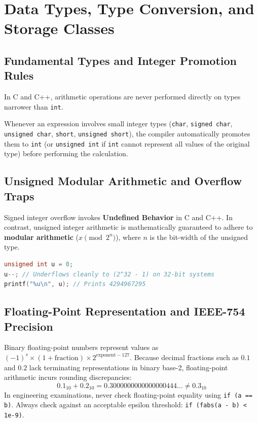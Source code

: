 \section{Data Types, Type Conversion, and Storage Classes}
\label{sec:data_types_storage_classes}

\subsection{Fundamental Types and Integer Promotion Rules}
In C and C++, arithmetic operations are never performed directly on types narrower than \texttt{int}.
\begin{keyconcept}
Whenever an expression involves small integer types (\texttt{char}, \texttt{signed char}, \texttt{unsigned char}, \texttt{short}, \texttt{unsigned short}), the compiler automatically promotes them to \texttt{int} (or \texttt{unsigned int} if \texttt{int} cannot represent all values of the original type) before performing the calculation.
\end{keyconcept}

\subsection{Unsigned Modular Arithmetic and Overflow Traps}
Signed integer overflow invokes \textbf{Undefined Behavior} in C and C++. In contrast, unsigned integer arithmetic is mathematically guaranteed to adhere to \textbf{modular arithmetic} ($x \pmod{2^n}$), where $n$ is the bit-width of the unsigned type.

\begin{lstlisting}[language=C]
unsigned int u = 0;
u--; // Underflows cleanly to (2^32 - 1) on 32-bit systems
printf("%u\n", u); // Prints 4294967295
\end{lstlisting}

\subsection{Floating-Point Representation and IEEE-754 Precision}
Binary floating-point numbers represent values as $(-1)^s \times (1 + \text{fraction}) \times 2^{\text{exponent}-127}$. Because decimal fractions such as $0.1$ and $0.2$ lack terminating representations in binary base-2, floating-point arithmetic incurs rounding discrepancies:
\[
0.1_{10} + 0.2_{10} = 0.3000000000000000444 \dots \ne 0.3_{10}
\]
In engineering examinations, never check floating-point equality using \texttt{if (a == b)}. Always check against an acceptable epsilon threshold: \texttt{if (fabs(a - b) < 1e-9)}.

